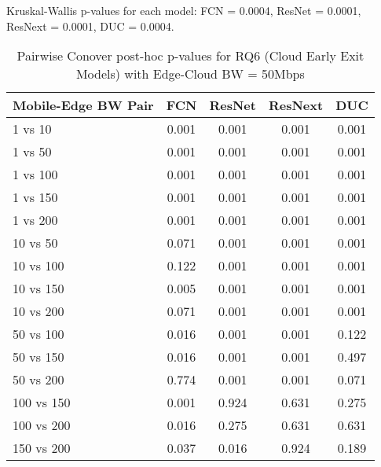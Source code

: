\begin{table}[h]
\centering
\caption{Pairwise Conover post-hoc p-values for RQ6 (Cloud Early Exit Models) with Edge-Cloud BW = 50Mbps}
\label{tab:conover_cloud_earlyexit_ec50}
\smallskip
Kruskal-Wallis p-values for each model: FCN = 0.0004, ResNet = 0.0001, ResNext = 0.0001, DUC = 0.0004.

\begin{tabular}{lcccc}
\toprule
Mobile-Edge BW Pair & FCN & ResNet & ResNext & DUC \\
\midrule
1 vs 10 & 0.001 & 0.001 & 0.001 & 0.001 \\
1 vs 50 & 0.001 & 0.001 & 0.001 & 0.001 \\
1 vs 100 & 0.001 & 0.001 & 0.001 & 0.001 \\
1 vs 150 & 0.001 & 0.001 & 0.001 & 0.001 \\
1 vs 200 & 0.001 & 0.001 & 0.001 & 0.001 \\
10 vs 50 & 0.071 & 0.001 & 0.001 & 0.001 \\
10 vs 100 & 0.122 & 0.001 & 0.001 & 0.001 \\
10 vs 150 & 0.005 & 0.001 & 0.001 & 0.001 \\
10 vs 200 & 0.071 & 0.001 & 0.001 & 0.001 \\
50 vs 100 & 0.016 & 0.001 & 0.001 & 0.122 \\
50 vs 150 & 0.016 & 0.001 & 0.001 & 0.497 \\
50 vs 200 & 0.774 & 0.001 & 0.001 & 0.071 \\
100 vs 150 & 0.001 & 0.924 & 0.631 & 0.275 \\
100 vs 200 & 0.016 & 0.275 & 0.631 & 0.631 \\
150 vs 200 & 0.037 & 0.016 & 0.924 & 0.189 \\
\bottomrule
\end{tabular}
\end{table}

